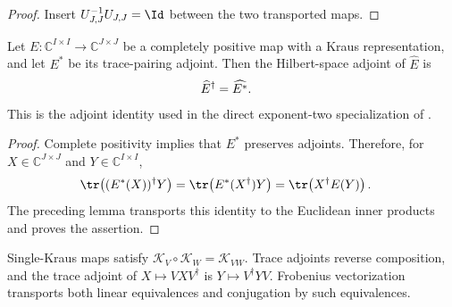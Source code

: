 \begin{proof}
    \leanok
    Insert $U_{J,J}^{-1}U_{J,J}=\Id$ between the two transported maps.
\end{proof}

\begin{theorem}
    \label{thm:kraus_trace_adjoint_frobenius_adjoint}
    \leanok
    Let $E:\mathbb C^{I\times I}\to\mathbb C^{J\times J}$ be a completely
    positive map with a Kraus representation, and let $E^*$ be its
    trace-pairing adjoint. Then the Hilbert-space adjoint of $\widehat E$ is
    \begin{align}
        \widehat E^\dagger&=\widehat{E^*}.
        \notag
    \end{align}
    This is the adjoint identity used in the direct exponent-two
    specialization of \cite[Theorem~6, Equation~(18)]{Beigi2013Sandwiched}.
\end{theorem}

\begin{proof}
    \leanok
    Complete positivity implies that $E^*$ preserves adjoints. Therefore, for
    $X\in\mathbb C^{J\times J}$ and $Y\in\mathbb C^{I\times I}$,
    \begin{align}
        \tr\!\left((E^*(X))^\dagger Y\right)
        &=\tr\!\left(E^*(X^\dagger)Y\right)
         =\tr\!\left(X^\dagger E(Y)\right).
        \notag
    \end{align}
    The preceding lemma transports this identity to the Euclidean inner
    products and proves the assertion.
\end{proof}

\begin{lemma}
    \label{lem:weighted_channel_transport_identities}
    \leanok
    Single-Kraus maps satisfy
    $\mathcal K_V\circ\mathcal K_W=\mathcal K_{VW}$. Trace adjoints reverse
    composition, and the trace adjoint of
    $X\mapsto VXV^\dagger$ is $Y\mapsto V^\dagger YV$.  Frobenius
    vectorization transports both linear equivalences and conjugation by such
    equivalences.
\end{lemma}

